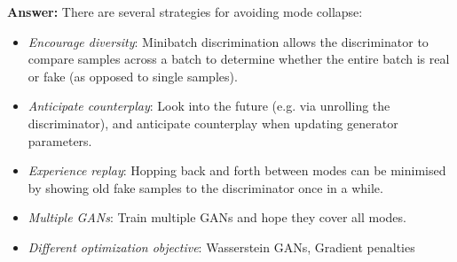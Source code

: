\documentclass{article}
\newenvironment{QandA}{\begin{enumerate}[label=\arabic*.]}{\end{enumerate}}
\newenvironment{InnerQandA}{\begin{enumerate}[label=\roman*.]}{\end{enumerate}}
\newenvironment{answer}{\par\normalfont \textbf{Answer:}}{}
\begin{document}
\begin{QandA}
\begin{InnerQandA}
\begin{answer}
            There are several strategies for avoiding mode collapse:
            \begin{itemize}
                \item \textit{Encourage diversity}: Minibatch discrimination allows the discriminator to compare samples across a batch to determine whether the entire batch is real or fake (as opposed to single samples).
                \item \textit{Anticipate counterplay}: Look into the future (e.g. via unrolling the discriminator), and anticipate counterplay when updating generator parameters.
                \item \textit{Experience replay}: Hopping back and forth between modes can be minimised by showing old fake samples to the discriminator once in a while.
                \item \textit{Multiple GANs}: Train multiple GANs and hope they cover all modes.
                \item \textit{Different optimization objective}: Wasserstein GANs, Gradient penalties
            \end{itemize}
        \end{answer}
    \end{InnerQandA}
\end{QandA}
\end{document}
